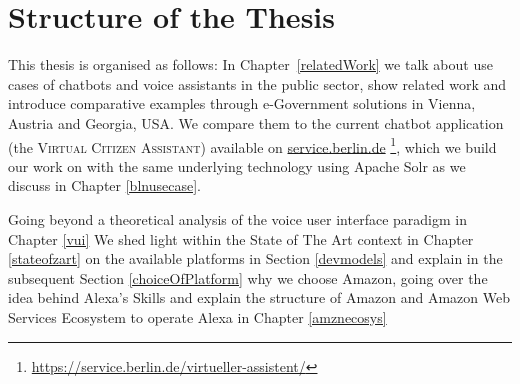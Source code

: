 \section{Structure of the Thesis}
%

This thesis is organised as follows:
In Chapter~\ref{relatedWork} %
we talk about use cases of chatbots and voice assistants in the public sector, 
show related work 
and introduce comparative examples
through e-Government solutions in
Vienna, Austria and Georgia, USA.
We compare them to the current chatbot application (the \textsc{Virtual Citizen Assistant}) available on \href{https://service.berlin.de/virtueller-assistent/virtueller-assistent-606279.php}{service.berlin.de} \footnote{\url{https://service.berlin.de/virtueller-assistent/}}, which we build our work on with the same underlying technology using Apache Solr as we discuss in Chapter \ref{blnusecase}.

%

Going beyond a theoretical analysis of the voice user interface paradigm in 
	Chapter 
\ref{vui}
We shed light within the State of The Art context in 
Chapter 
\ref{stateofzart} 
on the available platforms in Section \ref{devmodels} and explain in the subsequent Section \ref{choiceOfPlatform} why we choose Amazon, going over the idea behind Alexa's Skills
and explain the structure of Amazon and Amazon Web Services Ecosystem to operate Alexa in %
Chapter 
\ref{amznecosys}

%
%
%
%
%


